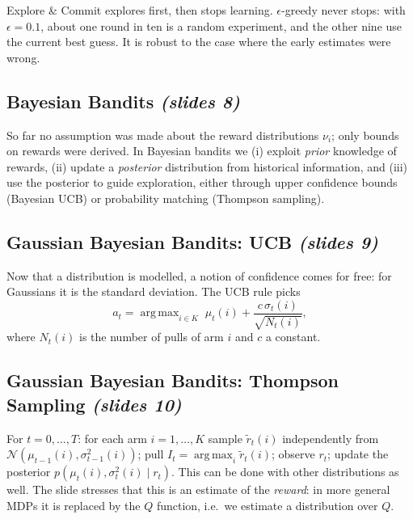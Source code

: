 \documentclass[11pt,a4paper]{article}
\DeclareMathOperator*{\argmax}{arg\,max}
\newcommand{\slr}[1]{\texorpdfstring{\emph{(slides #1)}}{(slides #1)}}
\theoremstyle{plain}
\theoremstyle{definition}
\theoremstyle{remark}
\begin{document}
\begin{intuition}
Explore \& Commit explores first, then stops learning. $\epsilon$-greedy never stops: with $\epsilon=0.1$, about one round in ten is a random experiment, and the other nine use the current best guess. It is robust to the case where the early estimates were wrong.
\end{intuition}

\subsection{Bayesian Bandits \slr{8}}
So far no assumption was made about the reward distributions $\nu_i$; only bounds on rewards were derived. In Bayesian bandits we (i) exploit \emph{prior} knowledge of rewards, (ii) update a \emph{posterior} distribution from historical information, and (iii) use the posterior to guide exploration, either through upper confidence bounds (Bayesian UCB) or probability matching (Thompson sampling).

\subsection{Gaussian Bayesian Bandits: UCB \slr{9}}
Now that a distribution is modelled, a notion of confidence comes for free: for Gaussians it is the standard deviation. The UCB rule picks
\[
  a_t=\argmax_{i\in K}\;\mu_t(i)+\frac{c\,\sigma_t(i)}{\sqrt{N_t(i)}},
\]
where $N_t(i)$ is the number of pulls of arm $i$ and $c$ a constant.

\subsection{Gaussian Bayesian Bandits: Thompson Sampling \slr{10}}
For $t=0,\dots,T$: for each arm $i=1,\dots,K$ sample $\tilde r_t(i)$ independently from $\mathcal N(\mu_{t-1}(i),\sigma^2_{t-1}(i))$; pull $I_t=\argmax_i\tilde r_t(i)$; observe $r_t$; update the posterior $p(\mu_t(i),\sigma_t^2(i)\mid r_t)$. This can be done with other distributions as well. The slide stresses that this is an estimate of the \emph{reward}: in more general MDPs it is replaced by the $Q$ function, i.e.\ we estimate a distribution over $Q$.
\end{document}

